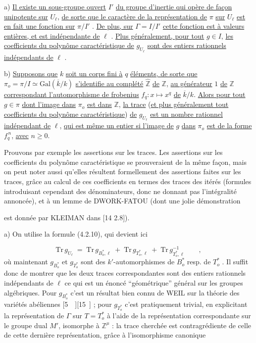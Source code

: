 a) \underline{Il existe un sous-groupe ouvert} $I'$ \underline{du groupe d'inertie qui opère de façon unipotente sur} $U_\ell$, \underline{de sorte que le caractère de la représentation de} $\pi$ \underline{sur} $U_\ell$ \underline{est en fait une fonction sur} $\pi/I'$ . \underline{De plus, sur} $\Gamma = I/I'$ \underline{cette fonction est à valeurs entières, et est indépendante de} $\ell$ . \underline{Plus généralement, pour tout} $g \in I$, \underline{les coefficients du polynôme caractéristique de} $g_{U_\ell}$ \underline{sont des entiers rationnels indépendants de} $\ell$ .

b) \underline{Supposons que} $k$ \underline{soit un corps fini à} $q$ \underline{éléments, de sorte que} $\pi_o = \pi/I \simeq \mathrm{Gal}(\overline{k}/k)$ \underline{s'identifie au complété} $\widehat{\mathbb{Z}}$ \underline{de} $\mathbb{Z}$, \underline{au générateur} $1$ \underline{de} $\mathbb{Z}$ \underline{correspondant l'automorphisme de frobenius} $f_q : x \longmapsto x^q$ \underline{de} $\overline{k}/k$. \underline{Alors pour tout} $g \in \pi$ \underline{dont l'image dans} $\pi_o$ \underline{est dans} $\mathbb{Z}$, \underline{la trace} (\underline{et plus généralement tout coefficients du polynôme caractéristique}) \underline{de} $g_{U_\ell}$ \underline{est un nombre rationnel indépendant de} $\ell$, \underline{qui est même un entier si l'image de} $g$ \underline{dans} $\pi_o$ \underline{est de la forme} $f_q^{\,n}$, \underline{avec} $n \geq 0$.

Prouvons par exemple les assertions sur les traces. Les assertions sur les coefficients du polynôme caractéristique se prouveraient de la même façon, mais on peut noter aussi qu'elles résultent formellement des assertions faites sur les traces, grâce au calcul de ces coefficients en termes des traces des itérés (formules introduisant cependant des dénominateurs, donc ne donnant pas l'intégralité annoncée), et à un lemme de DWORK-FATOU (dont une jolie démonstration



est donnée par KLEIMAN dans [14 2.8]).

a) On utilise la formule (4.2.10), qui devient ici

\begin{equation}\tag{4.3.0}
\mathrm{Tr}\, g_{U_\ell} \;=\; \mathrm{Tr}\, g_{B^{*}_{o},\ell} \;+\; \mathrm{Tr}\, g_{T^{*}_{o},\ell} \;+\; \mathrm{Tr}\, g^{-1}_{T^{*}_{o},\ell} \qquad ,
\end{equation}
où maintenant $g_{B^{*}_{o}}$ et $g_{T^{*}_{o}}$ sont des $k'$-automorphismes de $B^{*}_{o}$ resp. de $T^{*}_{o}$ . Il suffit donc de montrer que les deux traces correspondantes sont des entiers rationnels indépendants de $\ell$ ce qui est un énoncé ``géométrique'' général sur les groupes algébriques. Pour $g_{B^{*}_{o}}$ c'est un résultat bien connu de WEIL sur la théorie des variétés abéliennes [5\ \ ][15\ ] ; pour $g_{T^{*}_{o}}$ c'est pratiquement trivial, en explicitant la représentation de $\Gamma$ sur $T = T^{*}_{o}$ à l'aide de la représentation correspondante sur le groupe dual $M'$, isomorphe à $\mathbb{Z}^{\mu}$ : la trace cherchée est contragrédiente de celle de cette dernière représentation, grâce à l'isomorphisme canonique

